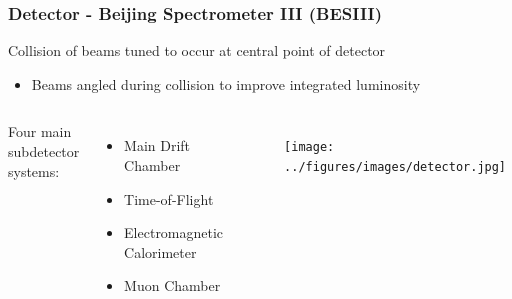 \documentclass[t]{beamer}
\newcommand{\addframe}[2]{
\begin{frame}
\frametitle{#1}
#2
\end{frame}
}
\newcommand{\additem}[1]{
\begin{itemize}
\item #1
\end{itemize}
}
\begin{document}
\addframe{Detector - Beijing Spectrometer III (BESIII)}{
Collision of beams tuned to occur at central point of detector
\additem{Beams angled during collision to improve integrated luminosity}

\vspace{-0.3cm}

\begin{columns}

\column{.5\textwidth} %

Four main subdetector systems:
\begin{itemize}
\item Main Drift Chamber
\item Time-of-Flight
\item Electromagnetic Calorimeter
\item Muon Chamber
\end{itemize}

\vspace{-0.3cm}

\begin{figure}
\texttt{[image: ../figures/images/detector.jpg]}
\end{figure}

\column{.5\textwidth} %

\begin{figure}
\includegraphics[width=\linewidth]{../figures/images/detector.pdf}
\end{figure}

\end{columns}

}
\end{document}
